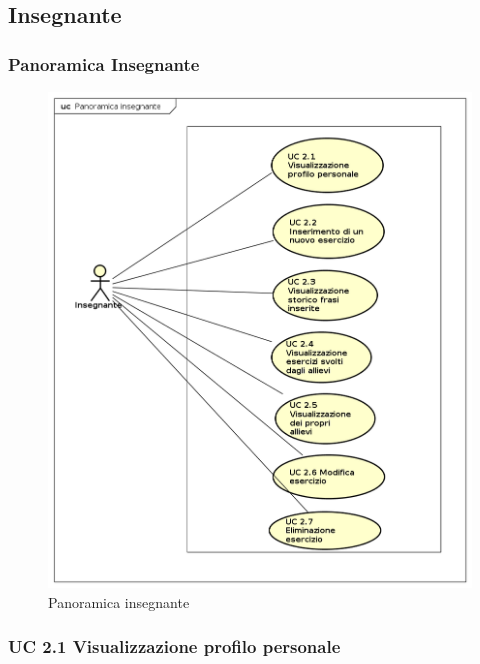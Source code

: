 
\subsection{Insegnante}

\subsubsection{Panoramica Insegnante}

\begin{figure}[H]
\centering
\includegraphics[width=14cm]{img/PanoramicaInsegnanti.png} 
\caption{Panoramica insegnante}
\end{figure}

\subsubsection{UC 2.1 Visualizzazione profilo personale}


